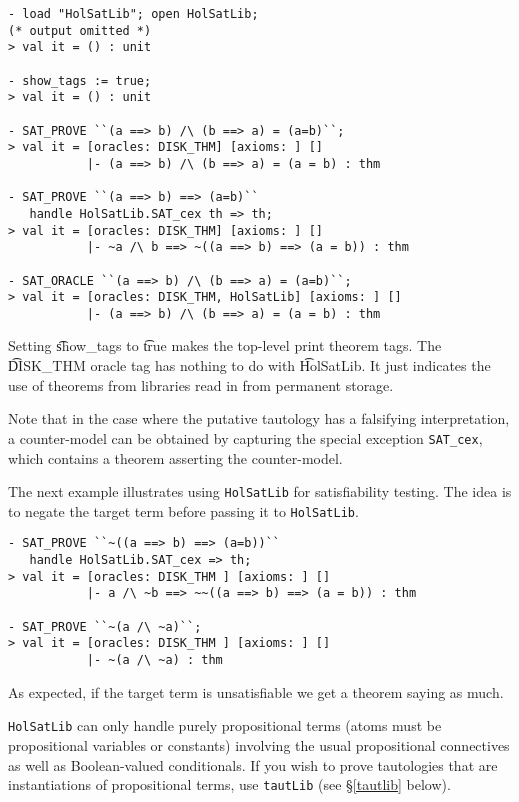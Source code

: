 \begin{session}
\begin{verbatim}
- load "HolSatLib"; open HolSatLib;
(* output omitted *)
> val it = () : unit

- show_tags := true;
> val it = () : unit

- SAT_PROVE ``(a ==> b) /\ (b ==> a) = (a=b)``;
> val it = [oracles: DISK_THM] [axioms: ] []
           |- (a ==> b) /\ (b ==> a) = (a = b) : thm

- SAT_PROVE ``(a ==> b) ==> (a=b)``
   handle HolSatLib.SAT_cex th => th;
> val it = [oracles: DISK_THM] [axioms: ] []
           |- ~a /\ b ==> ~((a ==> b) ==> (a = b)) : thm

- SAT_ORACLE ``(a ==> b) /\ (b ==> a) = (a=b)``;
> val it = [oracles: DISK_THM, HolSatLib] [axioms: ] []
           |- (a ==> b) /\ (b ==> a) = (a = b) : thm
\end{verbatim}
\end{session}

Setting \t{show\_tags} to \t{true} makes the \HOL{} top-level print theorem tags. The \t{DISK\_THM} oracle tag has nothing to do with \t{HolSatLib}. It just indicates the use of theorems from \HOL{} libraries read in from permanent storage.

Note that in the case where the putative tautology has a falsifying interpretation, a counter-model can be obtained by capturing the special exception {\tt{SAT\_cex}}, which contains a theorem asserting the counter-model.

The next example illustrates using {\tt{HolSatLib}} for satisfiability testing. The idea is to negate the target term before passing it to {\tt{HolSatLib}}.

\begin{session}
\begin{verbatim}
- SAT_PROVE ``~((a ==> b) ==> (a=b))``
   handle HolSatLib.SAT_cex => th;
> val it = [oracles: DISK_THM ] [axioms: ] []
           |- a /\ ~b ==> ~~((a ==> b) ==> (a = b)) : thm

- SAT_PROVE ``~(a /\ ~a)``;
> val it = [oracles: DISK_THM ] [axioms: ] []
           |- ~(a /\ ~a) : thm
\end{verbatim}
\end{session}

As expected, if the target term is unsatisfiable we get a theorem saying as much.

{\tt{HolSatLib}} can only handle purely propositional terms (atoms must be propositional variables or constants) involving the usual propositional connectives as well as Boolean-valued conditionals. If you wish to prove tautologies that are instantiations of propositional terms, use {\tt{tautLib}} (see \S\ref{tautlib} below).

